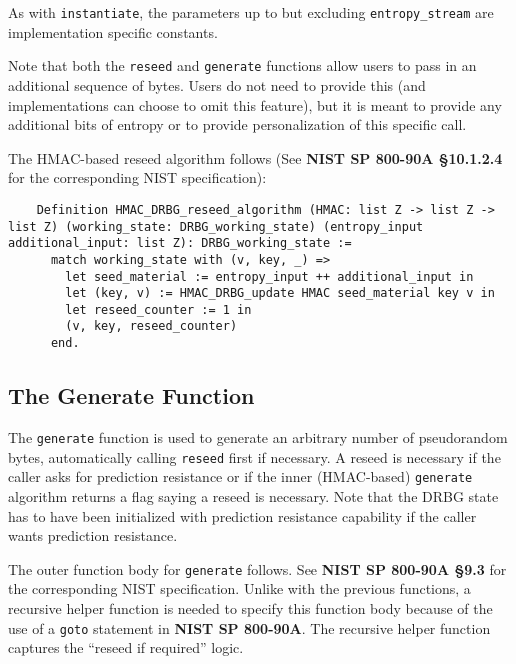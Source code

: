 \documentclass[pageno]{jpaper}
\newcommand{\stdtitle}[1]{\textbf{#1}}
\begin{document}
As with \lstinline{instantiate}, the parameters up to but excluding \lstinline{entropy_stream} are implementation specific constants.

Note that both the \lstinline{reseed} and \lstinline{generate} functions allow users to pass in an additional sequence of bytes. Users do not need to provide this (and implementations can choose to omit this feature), but it is meant to provide any additional bits of entropy or to provide personalization of this specific call.

The HMAC-based reseed algorithm follows (See \stdtitle{NIST SP 800-90A \S 10.1.2.4} for the corresponding NIST specification):

\begin{lstlisting}
    Definition HMAC_DRBG_reseed_algorithm (HMAC: list Z -> list Z -> list Z) (working_state: DRBG_working_state) (entropy_input additional_input: list Z): DRBG_working_state :=
      match working_state with (v, key, _) =>
        let seed_material := entropy_input ++ additional_input in
        let (key, v) := HMAC_DRBG_update HMAC seed_material key v in
        let reseed_counter := 1 in
        (v, key, reseed_counter)
      end.
\end{lstlisting}

\subsection{The Generate Function} \label{funcgenerate}
The \lstinline{generate} function is used to generate an arbitrary number of pseudorandom bytes, automatically calling \lstinline{reseed} first if necessary. A reseed is necessary if the caller asks for prediction resistance or if the inner (HMAC-based) \lstinline{generate} algorithm returns a flag saying a reseed is necessary. Note that the DRBG state has to have been initialized with prediction resistance capability if the caller wants prediction resistance.

The outer function body for \lstinline{generate} follows. See \stdtitle{NIST SP 800-90A \S 9.3} for the corresponding NIST specification. Unlike with the previous functions, a recursive helper function is needed to specify this function body because of the use of a \lstinline{goto} statement in \stdtitle{NIST SP 800-90A}. The recursive helper function captures the “reseed if required” logic.
\end{document}

